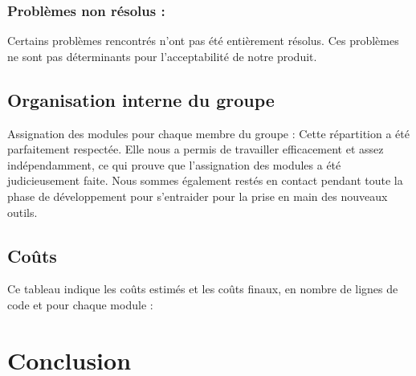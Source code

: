 			\subsubsection*{Problèmes non résolus :}
				Certains problèmes rencontrés n'ont pas été entièrement résolus. Ces problèmes ne sont pas déterminants pour l'acceptabilité de notre produit.
				
		\subsection{Organisation interne du groupe}
		Assignation des modules pour chaque membre du groupe :
		Cette répartition a été parfaitement respectée. Elle nous a permis de travailler efficacement et assez indépendamment, ce qui prouve que l'assignation des modules a été judicieusement faite. Nous sommes également restés en contact pendant toute la phase de développement pour s'entraider pour la prise en main des nouveaux outils.
	
		\subsection{Coûts}
		Ce tableau indique les coûts estimés et les coûts finaux, en nombre de lignes de code et pour chaque module :
	
	\section*{Conclusion}
		

